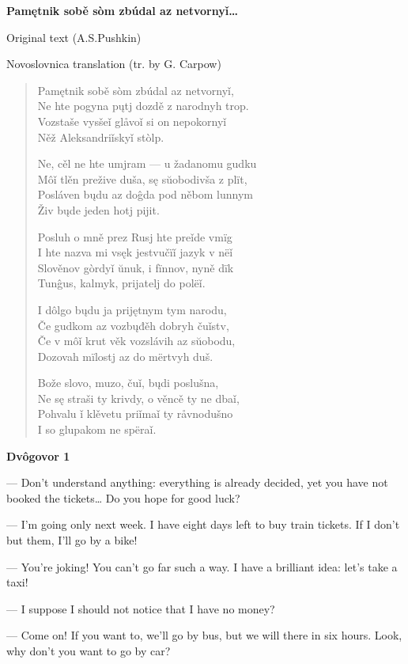 \textbf{Pamętnik sobě sòm zbúdal az netvornyǐ…}

Original text (A.S.Pushkin)

Novoslovnica translation (tr. by G. Carpow)

\begin{verse}
	Pamętnik sobě sòm zbúdal az netvornyǐ, \\
	Ne hte pogyna pųtj dozdě z narodnyh trop. \\	
	Vozstaše vysšeǐ glåvoǐ si on nepokornyǐ \\
	Něž Aleksandriǐskyǐ stòlp.
	
	Ne, cěl ne hte umjram — u žadanomu gudku \\	
	Môǐ tlěn prežive duša, sę sŭobodivša z plït, \\	
	Posláven bųdu az doĝda pod něbom lunnym \\
	Živ bųde jeden hotj pijit.
		
	Posluh o mně prez Rusj hte preǐde vmïg \\	
	I hte nazva mi vsęk jestvučïǐ jazyk v nëǐ \\	
	Slověnov gòrdyǐ ŭnuk, i fïnnov, nyně dïk \\	
	Tunĝus, kalmyk, prijatelj do polëǐ.
	
	I dôlgo bųdu ja prijętnym tym narodu, \\	
	Če gudkom az vozbųđěh dobryh čuǐstv, \\	
	Če v môǐ krut věk vozslávih az sŭobodu, \\	
	Dozovah mïlostj az do mërtvyh duš.
	
	Bože slovo, muzo, čuǐ, bųdi poslušna, \\	
	Ne sę straši ty krivdy, o věncě ty ne dbaǐ, \\	
	Pohvalu ǐ klěvetu priǐmaǐ ty råvnodušno \\	
	I so glupakom ne spëraǐ.
\end{verse}

\textbf{Dvôgovor 1}

— Don’t understand anything: everything is already decided, yet you have not booked the tickets… Do you hope for good luck?

— I’m going only next week. I have eight days left to buy train tickets. If I don’t but them, I’ll go by a bike!

— You’re joking! You can’t go far such a way. I have a brilliant idea: let’s take a taxi!

— I suppose I should not notice that I have no money?

— Come on! If you want to, we’ll go by bus, but we will there in six hours. Look, why don’t you want to go by car?

